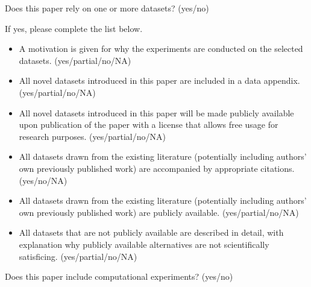 \noindent Does this paper rely on one or more datasets? (yes/no) 

\noindent If yes, please complete the list below.

\begin{itemize}
\item A motivation is given for why the experiments are conducted on the selected datasets. (yes/partial/no/NA) 
\item All novel datasets introduced in this paper are included in a data appendix. (yes/partial/no/NA) 
\item All novel datasets introduced in this paper will be made publicly available upon publication of the paper with a license that allows free usage for research purposes. (yes/partial/no/NA) 
\item All datasets drawn from the existing literature (potentially including authors’ own previously published work) are accompanied by appropriate citations. (yes/no/NA) 
\item All datasets drawn from the existing literature (potentially including authors’ own previously published work) are publicly available. (yes/partial/no/NA) 
\item All datasets that are not publicly available are described in detail, with explanation why publicly available alternatives are not scientifically satisficing. (yes/partial/no/NA) 
\end{itemize}


\noindent Does this paper include computational experiments? (yes/no)

